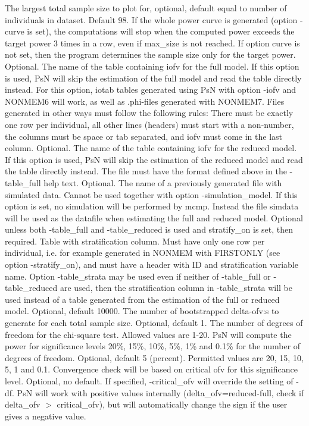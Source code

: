 \begin{optionlist}
\nextopt
{}
The largest total sample size to plot for, optional, default equal to number of individuals in dataset. 
\nextopt
{}
Default 98. If the whole power curve is generated (option -curve is set), the computations will stop when the computed power exceeds the target power 3 times in a row, even if max\_size is not reached. If option curve is not set, then the program determines the sample size only for the target power. 
\nextopt
{}
Optional. The name of the table containing iofv for the full model. If this option is used, PsN will skip the estimation of the full model and read the table directly instead. For this option, iotab tables generated using PsN with option -iofv and NONMEM6 will work, as well as .phi-files generated with NONMEM7. Files generated in other ways must follow the following rules: There must be exactly one row per individual, all other lines (headers) must start with a non-number, the columns must be space or tab separated, and iofv must come in the last column. 
\nextopt
{}
Optional. The name of the table containing iofv for the reduced model. If this option is used, PsN will skip the estimation of the reduced model and read the table directly instead. The file must have the format defined above in the -table\_full help text. 
\nextopt
{}
Optional. The name of a previously generated file with simulated data. Cannot be used together with option -simulation\_model. If this option is set, no simulation will be performed by mcmp. Instead the file simdata will be used as the datafile when estimating the full and reduced model. 
\nextopt
{}
Optional unless both -table\_full and -table\_reduced is used and stratify\_on is set, then required. Table with stratification column. Must have only one row per individual, i.e. for example generated in NONMEM with FIRSTONLY (see option -stratify\_on), and must have a header with ID and stratification variable name. Option -table\_strata may be used even if neither of -table\_full or -table\_reduced are used, then the stratification column in -table\_strata will be used instead of a table generated from the estimation of the full or reduced model. 
\nextopt
{}
Optional, default 10000. The number of bootstrapped delta-ofv:s to generate for each total sample size. 
\nextopt
{}
Optional, default 1. The number of degrees of freedom for the chi-square test. Allowed values are 1-20.
PsN will compute the power for significance levels 20\%, 15\%, 10\%, 5\%, 1\% and 0.1\% 
for the number of degrees of freedom. 
\nextopt
{}
Optional, default 5 (percent). Permitted values are 20, 15, 10, 5, 1 and 0.1. 
Convergence check will be based on critical ofv for this significance level. 
\nextopt
{}
Optional, no default. If specified, -critical\_ofv will override the setting of -df. PsN will work with positive values internally (delta\_ofv=reduced-full, check if delta\_ofv $>$ critical\_ofv), but will automatically change the sign if the user gives a negative value. 
\nextopt
\end{optionlist}


